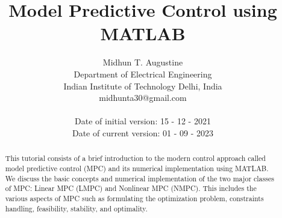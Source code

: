 \documentclass{article}
\title{Model Predictive Control using MATLAB}
\author{
  Midhun T. Augustine\\
  Department of Electrical Engineering\\
  Indian Institute of Technology Delhi, India \\
  midhunta30@gmail.com \\
 \vspace{.01cm}\\
  Date of initial version: 15 - 12 - 2021\\ Date of current version: 01 - 09 - 2023\\ \vspace{.01cm}}
\begin{document}
\maketitle

\begin{abstract}
This tutorial consists of a brief introduction to the modern control approach called model predictive control (MPC) and its numerical implementation using MATLAB. We discuss the basic concepts and numerical implementation of the two major classes of MPC: Linear MPC (LMPC) and Nonlinear MPC (NMPC). This includes the various aspects of MPC such as formulating the optimization problem,  constraints handling, feasibility, stability, and optimality.
\end{abstract}

\end{document}
